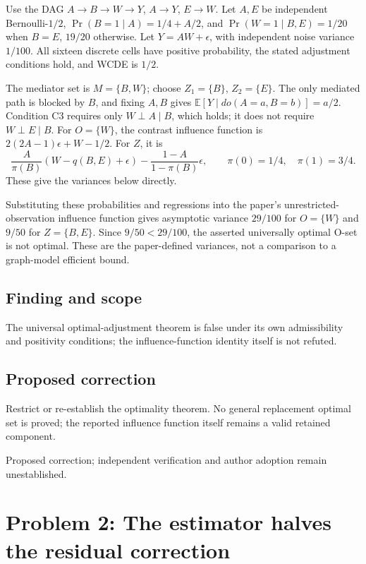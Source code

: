 \documentclass[11pt]{article}
\begin{document}
Use the DAG \(A\to B\to W\to Y\), \(A\to Y\), \(E\to W\). Let \(A,E\) be independent Bernoulli-\(1/2\), \(\Pr(B=1\mid A)=1/4+A/2\), and \(\Pr(W=1\mid B,E)=1/20\) when \(B=E\), \(19/20\) otherwise. Let \(Y=AW+\epsilon\), with independent noise variance \(1/100\). All sixteen discrete cells have positive probability, the stated adjustment conditions hold, and WCDE is \(1/2\).

The mediator set is \(M=\{B,W\}\); choose \(Z_1=\{B\}\), \(Z_2=\{E\}\). The only mediated path is blocked by \(B\), and fixing \(A,B\) gives \(\mathbb E[Y\mid do(A=a,B=b)]=a/2\). Condition C3 requires only \(W\perp A\mid B\), which holds; it does not require \(W\perp E\mid B\). For \(O=\{W\}\), the contrast influence function is \(2(2A-1)\epsilon+W-1/2\). For \(Z\), it is \[\frac{A}{\pi(B)}(W-q(B,E)+\epsilon)-\frac{1-A}{1-\pi(B)}\epsilon,\qquad\pi(0)=1/4,\quad\pi(1)=3/4.\] These give the variances below directly.

Substituting these probabilities and regressions into the paper's unrestricted-observation influence function gives asymptotic variance \(29/100\) for \(O=\{W\}\) and \(9/50\) for \(Z=\{B,E\}\). Since \(9/50<29/100\), the asserted universally optimal O-set is not optimal. These are the paper-defined variances, not a comparison to a graph-model efficient bound.

\subsection*{Finding and scope}

The universal optimal-adjustment theorem is false under its own admissibility and positivity conditions; the influence-function identity itself is not refuted.

\subsection*{Proposed correction}

Restrict or re-establish the optimality theorem. No general replacement optimal set is proved; the reported influence function itself remains a valid retained component.

Proposed correction; independent verification and author adoption remain unestablished.

\section*{Problem 2: The estimator halves the residual correction}
\end{document}
